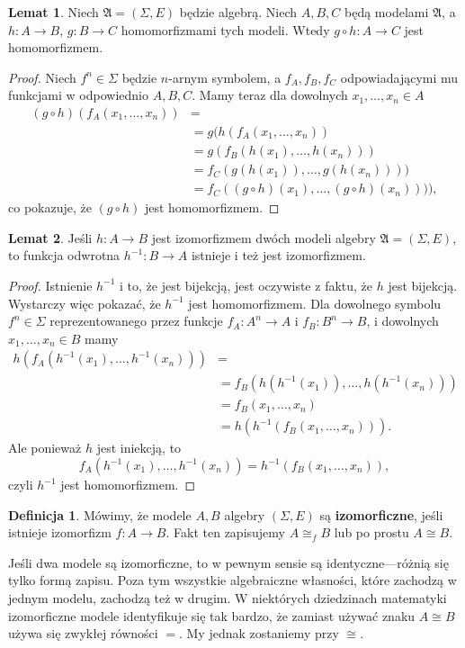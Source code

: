 \documentclass{book}
\theoremstyle{definition}
\newtheorem{definition}{Definicja}[section]
\newtheorem{lemma}{Lemat}[section]
\begin{document}
\begin{lemma}
	Niech $\mathfrak{A} = (\Sigma, E)$ będzie algebrą.
	Niech $A, B, C$ będą modelami $\mathfrak{A}$,
		a $h: A \to B$, $g: B \to C$ homomorfizmami tych modeli.
	Wtedy $g \circ h: A \to C$ jest homomorfizmem.
\end{lemma}
\begin{proof}
	Niech $f^n \in \Sigma$ będzie $n$-arnym symbolem,
		a $f_A, f_B, f_C$ odpowiadającymi mu funkcjami w odpowiednio $A, B, C$.
	Mamy teraz dla dowolnych $x_1, \dots, x_n \in A$
	\begin{align}
		(g \circ h)(f_A(x_1, \dots, x_n)) &= \\
			&= g(h(f_A(x_1, \dots, x_n)) \\
			&= g(f_B(h(x_1), \dots, h(x_n))) \\
			&= f_C(g(h(x_1)), \dots, g(h(x_n)))) \\
			&= f_C((g \circ h)(x_1), \dots, (g \circ h)(x_n)))),
\end{align}
	co pokazuje, że $(g \circ h)$ jest homomorfizmem.
\end{proof}

\begin{lemma}
	Jeśli $h: A \to B$ jest izomorfizmem dwóch modeli algebry $\mathfrak{A} = (\Sigma, E)$,
		to funkcja odwrotna $h^{-1}: B \to A$ istnieje i też jest izomorfizmem.
\end{lemma}
\begin{proof}
	Istnienie $h^{-1}$ i to,
		że jest bijekcją,
		jest oczywiste z faktu,
		że $h$ jest bijekcją.
	Wystarczy więc pokazać,
		że $h^{-1}$ jest homomorfizmem.
	Dla dowolnego symbolu $f^n \in \Sigma$ reprezentowanego przez funkcje
		$f_A: A^n \to A$ i $f_B: B^n \to B$,
		i dowolnych $x_1, \dots, x_n \in B$ mamy
	\begin{align}
		h(f_A(h^{-1}(x_1), \dots, h^{-1}(x_n))) &= \\
			&= f_B(h(h^{-1}(x_1)), \dots, h(h^{-1}(x_n))) \\
			&= f_B(x_1, \dots, x_n) \\
			&= h(h^{-1}(f_B(x_1, \dots, x_n))).
	\end{align}
	Ale ponieważ $h$ jest iniekcją, to
	\begin{equation}
		f_A(h^{-1}(x_1), \dots, h^{-1}(x_n)) = h^{-1}(f_B(x_1, \dots, x_n)),
	\end{equation}
	czyli $h^{-1}$ jest homomorfizmem.
\end{proof}

\begin{definition}
	Mówimy, że modele $A, B$ algebry $(\Sigma, E)$ są \textbf{izomorficzne},
		jeśli istnieje izomorfizm $f: A \to B$.
	Fakt ten zapisujemy $A \cong_f B$ lub po prostu $A \cong B$.
\end{definition}
Jeśli dwa modele są izomorficzne, to w pewnym sensie są identyczne---różnią się tylko formą zapisu.
Poza tym wszystkie algebraiczne własności,
	które zachodzą w jednym modelu,
	zachodzą też w drugim.
W niektórych dziedzinach matematyki izomorficzne modele identyfikuje się tak bardzo,
	że zamiast używać znaku $A \cong B$ używa się zwykłej równości $=$.
My jednak zostaniemy przy $\cong$.
\end{document}
